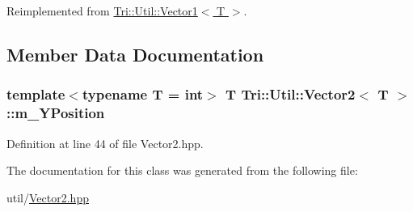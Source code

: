 Reimplemented from \hyperlink{class_tri_1_1_util_1_1_vector1_ad3fe27af88f400b0ffc651e7a9809c72}{Tri\+::\+Util\+::\+Vector1$<$ T $>$}.



\subsection{Member Data Documentation}
\hypertarget{class_tri_1_1_util_1_1_vector2_aa4c9efb1df95560f85c812ffed4fb903}{}
\subsubsection[{m\+\_\+\+Y\+Position}]{\setlength{\rightskip}{0pt plus 5cm}template$<$typename T = int$>$ T {\bf Tri\+::\+Util\+::\+Vector2}$<$ T $>$\+::m\+\_\+\+Y\+Position}\label{class_tri_1_1_util_1_1_vector2_aa4c9efb1df95560f85c812ffed4fb903}


Definition at line 44 of file Vector2.\+hpp.



The documentation for this class was generated from the following file\+:\begin{DoxyCompactItemize}
\item 
util/\hyperlink{_vector2_8hpp}{Vector2.\+hpp}\end{DoxyCompactItemize}
